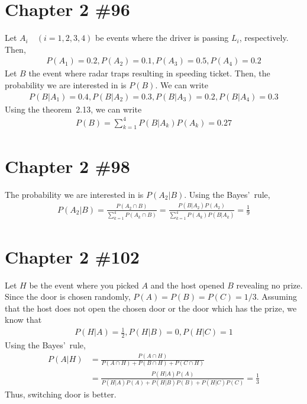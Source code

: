 \documentclass{scrartcl}
\begin{document}
\section{Chapter 2 \#96}
Let \(A_i \quad (i = 1, 2, 3, 4)\) be events where the driver is passing
\(L_i\), respectively. Then,
\begin{align*}
  P(A_1) = 0.2, P(A_2) = 0.1, P(A_3) = 0.5, P(A_4) = 0.2
\end{align*}
Let \(B\) the event where radar traps resulting in speeding ticket. Then, the
probability we are interested in is \(P(B)\). We can write
\begin{align*}
  P(B | A_1) = 0.4, P(B | A_2) = 0.3, P(B | A_3) = 0.2, P(B | A_4) = 0.3
\end{align*}
Using the theorem~2.13, we can write
\begin{align*}
  P(B) = \sum^4_{k = 1} P(B | A_k) P(A_k) = 0.27
\end{align*}

\section{Chapter 2 \#98}
The probability we are interested in is \(P(A_2 | B)\). Using the Bayes'~rule,
\begin{align*}
  P(A_2 | B)
  = \frac{P(A_2 \cap B)}{\sum^4_{k = 1} P(A_k \cap B)}
  = \frac{P(B | A_2) P(A_2)}{\sum^4_{k = 1} P(A_k) P(B | A_k)}
  = \frac{1}{9}
\end{align*}

\section{Chapter 2 \#102}
Let \(H\) be the event where you picked \(A\) and the host opened \(B\)
revealing no prize. Since the door is chosen randomly,
\(P(A) = P(B) = P(C) = 1/3\). Assuming that the host does not open the chosen
door or the door which has the prize, we know that
\begin{align*}
  P(H | A) = \frac{1}{2}, P(H | B) = 0, P(H | C) = 1
\end{align*}
Using the Bayes'~rule,
\begin{align*}
  P(A | H)
  &= \frac{P(A \cap H)}{P(A \cap H) + P(B \cap H) + P(C \cap H)} \\
  &= \frac{P(H | A) P(A)}{P(H | A) P(A) + P(H | B) P(B) + P(H | C) P(C)}
  = \frac{1}{3}
\end{align*}
Thus, switching door is better.
\end{document}
